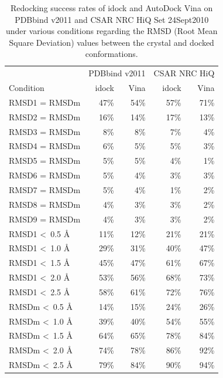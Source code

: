 \documentclass[12pt]{article}
\begin{document}
\begin{table}
\centering
\begin{tabular}{lrrrr}
\hline
& \multicolumn{2}{c}{PDBbind v2011} & \multicolumn{2}{c}{CSAR NRC HiQ}\\
Condition & idock & Vina & idock & Vina\\
\hline
RMSD1 = RMSDm           & 47\% & 54\% & 57\% & 71\%\\
RMSD2 = RMSDm           & 16\% & 14\% & 17\% & 13\%\\
RMSD3 = RMSDm           &  8\% &  8\% &  7\% &  4\%\\
RMSD4 = RMSDm           &  6\% &  5\% &  5\% &  3\%\\
RMSD5 = RMSDm           &  5\% &  5\% &  4\% &  1\%\\
RMSD6 = RMSDm           &  5\% &  4\% &  3\% &  3\%\\
RMSD7 = RMSDm           &  5\% &  4\% &  1\% &  2\%\\
RMSD8 = RMSDm           &  4\% &  3\% &  3\% &  2\%\\
RMSD9 = RMSDm           &  4\% &  3\% &  3\% &  2\%\\
\noalign{\smallskip}
RMSD1 \textless\ 0.5 \AA & 11\% & 12\% & 21\% & 21\%\\
RMSD1 \textless\ 1.0 \AA & 29\% & 31\% & 40\% & 47\%\\
RMSD1 \textless\ 1.5 \AA & 45\% & 47\% & 61\% & 67\%\\
RMSD1 \textless\ 2.0 \AA & 53\% & 56\% & 68\% & 73\%\\
RMSD1 \textless\ 2.5 \AA & 58\% & 61\% & 72\% & 76\%\\
\noalign{\smallskip}
RMSDm \textless\ 0.5 \AA & 14\% & 15\% & 24\% & 26\%\\
RMSDm \textless\ 1.0 \AA & 39\% & 40\% & 54\% & 55\%\\
RMSDm \textless\ 1.5 \AA & 64\% & 65\% & 78\% & 84\%\\
RMSDm \textless\ 2.0 \AA & 74\% & 78\% & 86\% & 92\%\\
RMSDm \textless\ 2.5 \AA & 79\% & 84\% & 90\% & 94\%\\
\hline
\end{tabular}
\caption{\label{SuccessRate} Redocking success rates of idock and AutoDock Vina on PDBbind v2011 and CSAR NRC HiQ Set 24Sept2010 under various conditions regarding the RMSD (Root Mean Square Deviation) values between the crystal and docked conformations.}
\end{table}

\clearpage
\end{document}
